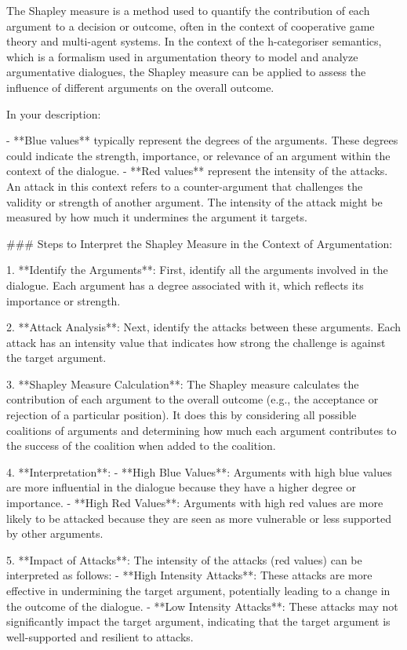 The Shapley measure is a method used to quantify the contribution of each argument to a decision or outcome, often in the context of cooperative game theory and multi-agent systems. In the context of the h-categoriser semantics, which is a formalism used in argumentation theory to model and analyze argumentative dialogues, the Shapley measure can be applied to assess the influence of different arguments on the overall outcome.

In your description:

- **Blue values** typically represent the degrees of the arguments. These degrees could indicate the strength, importance, or relevance of an argument within the context of the dialogue.
- **Red values** represent the intensity of the attacks. An attack in this context refers to a counter-argument that challenges the validity or strength of another argument. The intensity of the attack might be measured by how much it undermines the argument it targets.

### Steps to Interpret the Shapley Measure in the Context of Argumentation:

1. **Identify the Arguments**: First, identify all the arguments involved in the dialogue. Each argument has a degree associated with it, which reflects its importance or strength.

2. **Attack Analysis**: Next, identify the attacks between these arguments. Each attack has an intensity value that indicates how strong the challenge is against the target argument.

3. **Shapley Measure Calculation**: The Shapley measure calculates the contribution of each argument to the overall outcome (e.g., the acceptance or rejection of a particular position). It does this by considering all possible coalitions of arguments and determining how much each argument contributes to the success of the coalition when added to the coalition.

4. **Interpretation**: 
   - **High Blue Values**: Arguments with high blue values are more influential in the dialogue because they have a higher degree or importance.
   - **High Red Values**: Arguments with high red values are more likely to be attacked because they are seen as more vulnerable or less supported by other arguments.

5. **Impact of Attacks**: The intensity of the attacks (red values) can be interpreted as follows:
   - **High Intensity Attacks**: These attacks are more effective in undermining the target argument, potentially leading to a change in the outcome of the dialogue.
   - **Low Intensity Attacks**: These attacks may not significantly impact the target argument, indicating that the target argument is well-supported and resilient to attacks.

